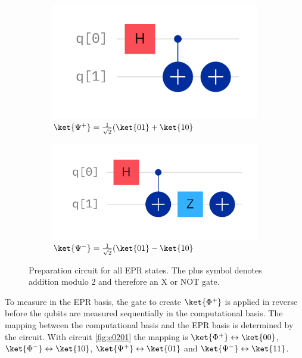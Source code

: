 \begin{figure}[h]
\begin{subfigure}[t]{0.24\textwidth}
        \label{fig:e0202}
    \end{subfigure}
    \begin{subfigure}[t]{0.24\textwidth}
        \includegraphics[width=\textwidth]{tex/figures/exercise02_03.png}
        \caption{$\ket{\Psi^+} = \frac{1}{\sqrt{2}}(\ket{01} + \ket{10}$}
        \label{fig:e0203}
    \end{subfigure}
    \begin{subfigure}[t]{0.29\textwidth}
        \includegraphics[width=\textwidth]{tex/figures/exercise02_04.png}
        \caption{$\ket{\Psi^-} = \frac{1}{\sqrt{2}}(\ket{01} - \ket{10}$}
        \label{fig:e0204}
    \end{subfigure}
    \caption{Preparation circuit for all EPR states. The plus symbol denotes addition modulo 2 and therefore an X or NOT gate.}
    \label{fig:prepare_EPR}
    \addtocounter{figure}{-1}
\end{figure}
To measure in the EPR basis, the gate to create $\ket{\Phi^+}$ is applied in reverse before the qubits are measured sequentially in the computational basis. The mapping between the computational basis and the EPR basis is determined by the circuit. With circuit \ref{fig:e0201} the mapping is $\ket{\Phi^+} \leftrightarrow \ket{00}$, $\ket{\Phi^-} \leftrightarrow \ket{10}$, $\ket{\Psi^+} \leftrightarrow \ket{01}$ and $\ket{\Psi^-} \leftrightarrow \ket{11}$.
